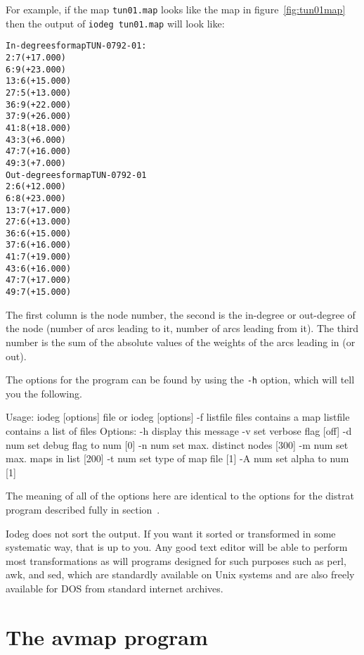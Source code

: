 \documentclass[%
	11pt,
        a4paper,
        twoside]{workrep}
\newcommand*{\prg}[1]{\textsf{#1}}		%
\newcommand*{\cmd}[1]{\texttt{#1}}		%
\newcommand*{\file}[1]{\texttt{#1}}		%
\newcommand*{\opt}[1]{\texttt{#1}}		%
\begin{document}
For example, if the map \file{tun01.map} looks like the map in
figure~\ref{fig:tun01map} then the output of \cmd{iodeg tun01.map}
will look like:

\begin{alltt}
In-degrees for map TUN-0792-01:
		    2:     7  (+17.000)
		    6:     9  (+23.000)
		   13:     6  (+15.000)
		   27:     5  (+13.000)
		   36:     9  (+22.000)
		   37:     9  (+26.000)
		   41:     8  (+18.000)
		   43:     3  (+6.000)
		   47:     7  (+16.000)
		   49:     3  (+7.000)
Out-degrees for map TUN-0792-01
		    2:     6  (+12.000)
		    6:     8  (+23.000)
		   13:     7  (+17.000)
		   27:     6  (+13.000)
		   36:     6  (+15.000)
		   37:     6  (+16.000)
		   41:     7  (+19.000)
		   43:     6  (+16.000)
		   47:     7  (+17.000)
		   49:     7  (+15.000)
\end{alltt}
The first column is the node number, the second is the in-degree
or out-degree of the node (number of arcs leading to it, number
of arcs leading from it).  The third number is the sum of the
absolute values of the weights of the arcs leading in (or out).

The options for the program can be found by using the \opt{-h}
option, which will tell you the following.
\begin{verbatimtab}
Usage: iodeg [options] file
   or  iodeg [options] -f listfile
	files contains a map
	listfile contains a list of files
	Options:
		-h	display this message
		-v	set verbose flag [off]
		-d num	set debug flag to num [0]
		-n num	set max. distinct nodes [300]
		-m num	set max. maps in list [200]
		-t num	set type of map file [1]
		-A num	set alpha to num [1]
\end{verbatimtab}
The meaning of all of the options here are identical to the options
for the \prg{distrat} program described fully
in section~.

\prg{Iodeg} does not sort the output.  If you want it sorted
or transformed in some systematic way, that is up to you.  Any
good text editor will be able to perform most transformations as
will programs designed for such purposes such as \prg{perl},
\prg{awk}, and \prg{sed}, which are standardly available on
Unix systems and are also freely available for DOS from
standard internet archives.



\chapter{The \prg{avmap} program}\label{ch:avmap}
\end{document}
